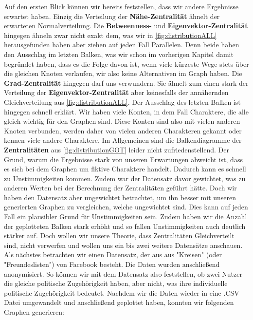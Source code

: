  Auf den ersten Blick können wir bereits feststellen, dass wir andere Ergebnisse erwartet haben. Einzig die Verteilung der \textbf{Nähe-Zentralität} ähnelt der erwarteten Normalverteilung. Die \textbf{Betweenness-} und \textbf{Eigenvektor-Zentralität} hingegen ähneln zwar nicht exakt dem, was wir in \ref{fig:distributionALL} herausgefunden haben aber ziehen auf jeden Fall Parallelen. Denn beide haben den Ausschlag im letzten Balken, was wir schon im vorherigen Kapitel damit begründet haben, dass es die Folge davon ist, wenn viele kürzeste Wege stets über die gleichen
Knoten verlaufen, wir also keine Alternativen im Graph haben. Die \textbf{Grad-Zentralität} hingegen darf uns verwundern. Sie ähnelt zum einen stark der Verteilung der \textbf{Eigenvektor-Zentralität} aber keinesfalls der annähernden Gleichverteilung aus \ref{fig:distributionALL}. Der Ausschlag des letzten Balken ist hingegen schnell erklärt. Wir haben viele Konten, in dem Fall Charaktere, die alle gleich wichtig für den Graphen sind. Diese Konten sind also mit vielen anderen Knoten verbunden, werden daher von vielen anderen Charakteren gekannt oder kennen viele andere Charaktere. Im Allgemeinen sind die Balkendiagramme der \textbf{Zentralitäten} aus \ref{fig:distributionGOT} leider nicht zufriedenstellend. Der Grund, warum die Ergebnisse stark von unseren Erwartungen abweicht ist, dass es sich bei dem Graphen um fiktive Charaktere handelt. Dadurch kann es schnell zu Unstimmigkeiten kommen. Zudem war der Datensatz davor gewichtet, was zu anderen Werten bei der Berechnung der Zentralitäten geführt hätte. Doch wir haben den Datensatz aber ungewichtet betrachtet, um ihn besser mit unseren generierten Graphen zu vergleichen, welche ungewichtet sind. Dies kann auf jeden Fall ein plausibler Grund für Unstimmigkeiten sein. Zudem haben wir die Anzahl der geplotteten Balken stark erhöht und so fallen Unstimmigkeiten auch deutlich stärker auf. Doch wollen wir unsere Theorie, dass Zentralitäten Gleichverteilt sind, nicht verwerfen und wollen uns ein bis zwei weitere Datensätze anschauen. Als nächstes betrachten wir einen Datensatz, der aus aus "Kreisen" (oder "Freundeslisten") von Facebook besteht. Die Daten wurden anschließend anonymisiert. So können wir mit dem Datensatz also feststellen, ob zwei Nutzer die gleiche politische Zugehörigkeit haben, aber nicht, was ihre individuelle politische Zugehörigkeit bedeutet.
Nachdem wir die Daten wieder in eine .CSV Datei umgewandelt und anschließend geplottet haben, konnten wir folgenden Graphen generieren: 


